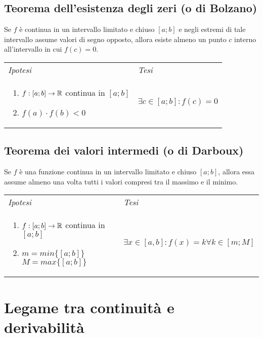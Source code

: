 \documentclass{article}     %
\begin{document}
    \subsection{Teorema dell'esistenza degli zeri (o di Bolzano)}
        \begin{shadedTheorem}[Bolzano]
            Se $f$ è continua in un intervallo limitato e chiuso $[a;b]$ e negli estremi di tale intervallo assume valori di segno opposto, allora esiste almeno un punto $c$ interno all'intervallo in cui $f(c)=0$.
        \end{shadedTheorem}
        \begin{tabular}{m{}m{}}
            \textit{Ipotesi} & \textit{Tesi}  \\
            \begin{enumerate}
                \item $f: [a;b] \to \mathbb{R}$ continua in $[a;b]$
                \item $f(a) \cdot f(b)<0$
            \end{enumerate} & $\exists c \in [a;b]:f(c)=0$ 
        \end{tabular}
    
    \subsection{Teorema dei valori intermedi (o di Darboux)}
        \begin{shadedTheorem}[Darbaux]
            Se $f$ è una funzione continua in un intervallo limitato e chiuso $[a;b]$, allora essa assume almeno una volta tutti i valori compresi tra il massimo e il minimo.
        \end{shadedTheorem}
        \begin{tabular}{m{}m{}}
            \textit{Ipotesi} & \textit{Tesi}  \\
            \begin{enumerate}
                \item $f: [a;b]\to \mathbb{R}$ continua in $[a;b]$
                \item $m=min\{[a;b]\}$ ~~~ $M=max\{[a;b]\}$
            \end{enumerate} & $\exists x \in [a,b] : f(x)=k \forall k \in [m;M]$
        \end{tabular}
    
\section{Legame tra continuità e derivabilità}
\end{document}
